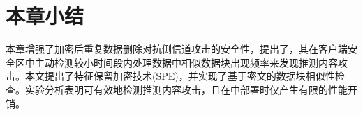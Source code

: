 \section{本章小结}
\label{sec:featurespy-conclusion}
本章增强了加密后重复数据删除对抗侧信道攻击的安全性，提出了\sysnameF，其在客户端安全区中主动检测较小时间段内处理数据中相似数据块出现频率来发现推测内容攻击。本文提出了特征保留加密技术(SPE)，并实现了基于密文的数据块相似性检查。实验分析表明\sysnameF 可有效地检测推测内容攻击，且在\sysnameS 中部署时仅产生有限的性能开销。
